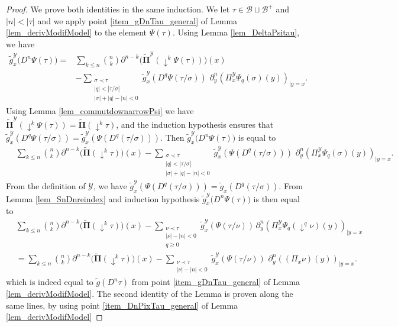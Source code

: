 \documentclass[11pt]{preprint}
\newcommand{\mcB}{\mathcal{B}}
\newcommand{\mcY}{\mathcal{Y}}
\def\PPi{\boldsymbol{\Pi}}
\begin{document}
	\begin{proof}
		We prove both identities in the same induction. We let $\tau\in\mcB\sqcup\mcB^+$ and $|n|<|\tau|$ and we apply point \ref{item_gDnTau_general} of Lemma \ref{lem_derivModifModel} to the element $\Psi(\tau)$. Using Lemma \ref{lem_DeltaPsitau}, we have
		\begin{align*}
		\widetilde{ g}^\mcY_x\big( D^n \Psi(\tau) \big) =& \sum_{k\leq n} \binom{n}{k} \partial^{n-k} \Big(\widetilde{\PPi}^\mcY\left( \downarrow^k\Psi(\tau)\right)\Big)(x) 
		\\&-
			\sum_{\substack{\sigma\prec\tau \\ |q|<|\tau/\sigma| \\ |\sigma|+|q|-|n|<0}} \widetilde{g}^\mcY_x\left(D^q\Psi(\tau/\sigma)\right) \,\, \partial^n_{y} \left({\Pi}^\mcY_x\Psi_q(\sigma)(y)\right)_{|y=x}.
		\end{align*}
		Using Lemma \ref{lem_commutdownarrowPsi} we have $\widetilde{\PPi}^\mcY\left( \downarrow^k\Psi(\tau)\right)=\widetilde{\PPi}\left( \downarrow^k\tau\right)$, and the induction hypothesis ensures that 
		$\widetilde{g}^\mcY_x\left(D^q\Psi(\tau/\sigma)\right) = \widetilde{g}^\mcY_x\left(\Psi(D^q(\tau/\sigma))\right)$. Then $	\widetilde{ g}^\mcY_x\big( D^n \Psi(\tau) \big)$ is equal to 
		\begin{align*}
			& \sum_{k\leq n} \binom{n}{k} \partial^{n-k} \Big(\widetilde{\PPi}\left( \downarrow^k\tau\right)\Big) (x)
			-
				\sum_{\substack{\sigma\prec\tau \\ |q|<|\tau/\sigma| \\ |\sigma|+|q|-|n|<0}} \widetilde{g}^\mcY_x\left(\Psi(D^q(\tau/\sigma))\right) \,\, \partial^n_{y} \left({\Pi}^\mcY_x\Psi_q(\sigma)(y)\right)_{|y=x}.
		\end{align*}
		From the definition of $\mcY$, we have $\widetilde{g}^\mcY_x\left(\Psi(D^q(\tau/\sigma))\right)=\widetilde{g}_x\left(D^q(\tau/\sigma)\right)$. From Lemma \ref{lem_SnDnreindex} and induction hypothesis $	\widetilde{ g}^\mcY_x\big( D^n \Psi(\tau) \big)$ is then equal to 
		\begin{align*}
			& \sum_{k\leq n} \binom{n}{k} \partial^{n-k} \Big(\widetilde{\PPi}\left( \downarrow^k\tau\right)\Big) (x)
			-
			\sum_{\substack{\nu\prec\tau  \\ |\nu|-|n|<0 \\ q\geq 0}} \widetilde{g}^\mcY_x\left(\Psi(\tau/\nu)\right) \, \partial^n_{y} \left({\Pi}^\mcY_x\Psi_q(\downarrow^q\nu)(y)\right)_{|y=x}
			\\
			&=
			\sum_{k\leq n} \binom{n}{k} \partial^{n-k} \Big(\widetilde{\PPi}\left( \downarrow^k\tau\right)\Big) (x)
			-
			\sum_{\substack{\nu\prec\tau  \\ |\nu|-|n|<0 }} \widetilde{g}^\mcY_x\left(\Psi(\tau/\nu)\right) \,\, \partial^n_{y} \left(({\Pi}_x\nu)(y)\right)_{|y=x}.
		\end{align*}
		which is indeed equal to $\widetilde{g}(D^n\tau)$ from point \ref{item_gDnTau_general} of Lemma  \ref{lem_derivModifModel}.
		The second identity of the Lemma is proven along the same lines, by using point \ref{item_DnPixTau_general} of Lemma \ref{lem_derivModifModel}
		
	\end{proof}
\end{document}
